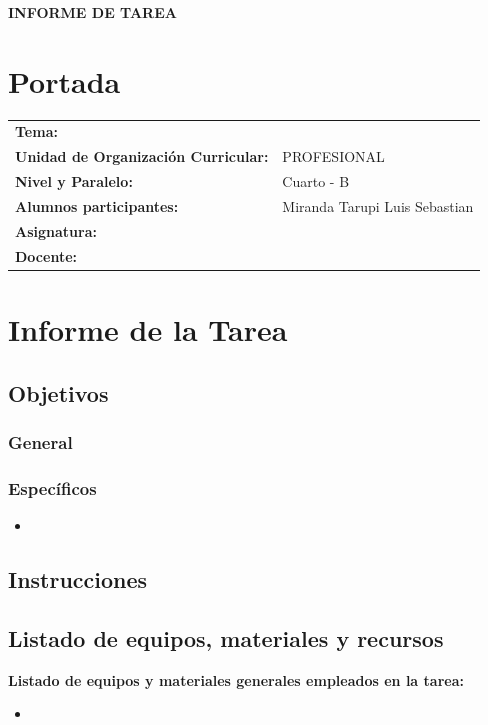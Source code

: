 \documentclass{article}
\begin{document}
\begin{center}
    {\large \textbf{INFORME DE TAREA}} \\    
\end{center}

\section{Portada}
\begin{flushleft}
\begin{tabular}{ l l }
    \textbf{Tema:} & 
 \\
    \textbf{Unidad de Organización Curricular:} & PROFESIONAL \\
    \textbf{Nivel y Paralelo:} & Cuarto - B \\
    \textbf{Alumnos participantes:} & Miranda Tarupi Luis Sebastian \\
    \textbf{Asignatura:} &  \\
    \textbf{Docente:} &  \\
\end{tabular}
\end{flushleft}


\section{Informe de la Tarea}
\subsection{Objetivos}
\subsubsection{General}


\subsubsection{Específicos}
\begin{itemize}
    \item 
\end{itemize}


\subsection{Instrucciones}
\begin{itemize}
   
\end{itemize}

\subsection{Listado de equipos, materiales y recursos}
\textbf{Listado de equipos y materiales generales empleados en la tarea:}
\begin{itemize}
    \item 
\end{itemize}
\end{document}
